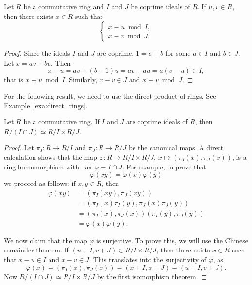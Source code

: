 \begin{theorem}
Let $R$ be a commutative ring and $I$ and $J$ be coprime ideals of $R$. 
If $u,v\in R$, then 
there exists $x\in R$ such that 
\[
\begin{cases}	
x\equiv u\bmod I,\\
x\equiv v\bmod J.
\end{cases}
\]
\end{theorem}

\begin{proof}
Since the ideals $I$ and $J$ are coprime, $1=a+b$ for some $a\in I$ and $b\in J$. 
Let $x=av+bu$. Then
\[
x-u=av+(b-1)u=av-au=a(v-u)\in I,
\]
that is $x\equiv u\bmod I$. Similarly, $x-v\in J$ and $x\equiv v\bmod J$.  	
\end{proof}

For the following result, we need 
to use the direct product of rings. See Example~\ref{exa:direct_rings}. 

\begin{corollary}
	Let $R$ be a commutative ring. If $I$ and $J$ are coprime ideals of $R$, 
	then $R/(I\cap J)\simeq R/I\times R/J$.
\end{corollary}

\begin{proof}
	Let $\pi_I\colon R\to R/I$ and $\pi_J\colon R\to R/J$ be the canonical maps. A direct 
	calculation shows that the
	map $\varphi\colon R\to R/I\times R/J$, $x\mapsto (\pi_I(x),\pi_J(x))$, 
	is a ring homomorphism with $\ker\varphi=I\cap J$. For example, to prove
 that 
 \[
 \varphi(xy)=\varphi(x)\varphi(y)
 \]
 we proceed as follows: if $x,y\in R$, then 
        \begin{align*}
            \varphi(xy) &= (\pi_I(xy),\pi_J(xy))\\
            &= (\pi_I(x)\pi_I(y),\pi_J(x)\pi_J(y))\\
            &= (\pi_I(x),\pi_J(x))(\pi_I(y),\pi_J(y))\\
            &= \varphi(x)\varphi(y). 
        \end{align*}

 We now claim that the map $\varphi$ is surjective. To prove this, 
 we will use the Chinese remainder theorem. If $(u+I,v+J)\in R/I\times R/J$, 
	then there exists $x\in R$ such that 
	$x-u\in I$ and $x-v\in J$. This translates into the surjectivity of $\varphi$,
 as \[
 \varphi(x)=(\pi_I(x),\pi_J(x))=(x+I,x+J)=(u+I,v+J).
 \]
 Now
	$R/(I\cap J)\simeq R/I\times R/J$ by the first isomorphism theorem. 
\end{proof}


